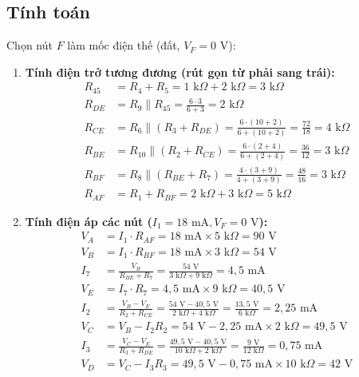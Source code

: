 \subsection{Tính toán}
\noindent Chọn nút $F$ làm mốc điện thế (đất, $V_F = 0\text{ V}$):
\begin{enumerate}[leftmargin=2em]
  \item \textbf{Tính điện trở tương đương (rút gọn từ phải sang trái):}
        \begin{align*}
        R_{45} &= R_4 + R_5 = 1\text{ k}\Omega + 2\text{ k}\Omega = 3\text{ k}\Omega \\
        R_{DE} &= R_9 \parallel R_{45} = \frac{6 \cdot 3}{6 + 3} = 2\text{ k}\Omega \\
        R_{CE} &= R_6 \parallel (R_3 + R_{DE}) = \frac{6 \cdot (10 + 2)}{6 + (10 + 2)} = \frac{72}{18} = 4\text{ k}\Omega \\
        R_{BE} &= R_{10} \parallel (R_2 + R_{CE}) = \frac{6 \cdot (2 + 4)}{6 + (2 + 4)} = \frac{36}{12} = 3\text{ k}\Omega \\
        R_{BF} &= R_8 \parallel (R_{BE} + R_7) = \frac{4 \cdot (3 + 9)}{4 + (3 + 9)} = \frac{48}{16} = 3\text{ k}\Omega \\
        R_{AF} &= R_1 + R_{BF} = 2\text{ k}\Omega + 3\text{ k}\Omega = 5\text{ k}\Omega
        \end{align*}
  \item \textbf{Tính điện áp các nút ($I_1 = 18\text{ mA}, V_F = 0\text{ V}$):}
        \begin{align*}
        V_A &= I_1 \cdot R_{AF} = 18\text{ mA} \times 5\text{ k}\Omega = 90\text{ V} \\
        V_B &= I_1 \cdot R_{BF} = 18\text{ mA} \times 3\text{ k}\Omega = 54\text{ V} \\
        I_7 &= \frac{V_B}{R_{BE} + R_7} = \frac{54\text{ V}}{3\text{ k}\Omega + 9\text{ k}\Omega} = 4{,}5\text{ mA} \\
        V_E &= I_7 \cdot R_7 = 4{,}5\text{ mA} \times 9\text{ k}\Omega = 40{,}5\text{ V} \\
        I_2 &= \frac{V_B - V_E}{R_2 + R_{CE}} = \frac{54\text{ V} - 40{,}5\text{ V}}{2\text{ k}\Omega + 4\text{ k}\Omega} = \frac{13{,}5\text{ V}}{6\text{ k}\Omega} = 2{,}25\text{ mA} \\
        V_C &= V_B - I_2 R_2 = 54\text{ V} - 2{,}25\text{ mA} \times 2\text{ k}\Omega = 49{,}5\text{ V} \\
        I_3 &= \frac{V_C - V_E}{R_3 + R_{DE}} = \frac{49{,}5\text{ V} - 40{,}5\text{ V}}{10\text{ k}\Omega + 2\text{ k}\Omega} = \frac{9\text{ V}}{12\text{ k}\Omega} = 0{,}75\text{ mA} \\
        V_D &= V_C - I_3 R_3 = 49{,}5\text{ V} - 0{,}75\text{ mA} \times 10\text{ k}\Omega = 42\text{ V}
        \end{align*}
\end{enumerate}

